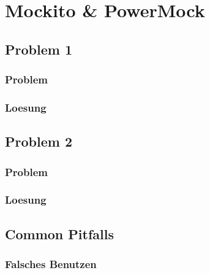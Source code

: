 \documentclass{beamer}
\begin{document}
	
	\section{Mockito \& PowerMock}


		\subsection{Problem 1}

			\begin{frame}
				\frametitle{Problem}
			\end{frame}

			\begin{frame}
				\frametitle{Loesung}
			\end{frame}


		\subsection{Problem 2}

			\begin{frame}
				\frametitle{Problem}
			\end{frame}

			\begin{frame}
				\frametitle{Loesung}
			\end{frame}

		\subsection{Common Pitfalls}

			\begin{frame}
				\frametitle{Falsches Benutzen}
			\end{frame}
\end{document}
